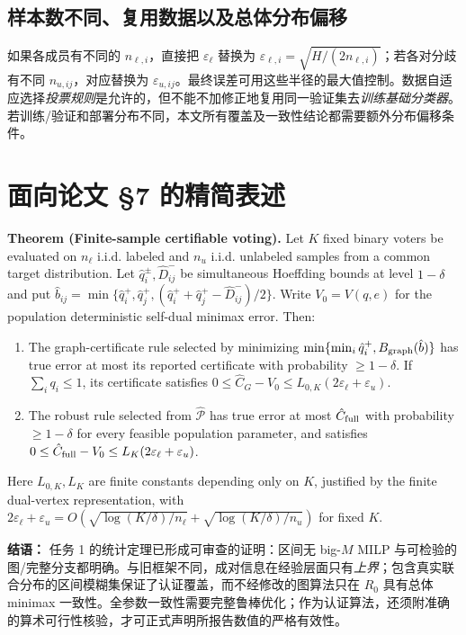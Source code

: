 \documentclass[11pt,a4paper]{ctexart}
\theoremstyle{definition}
\newcommand{\calP}{\mathcal P}
\newcommand{\epsl}{\varepsilon_{\ell}}
\newcommand{\epsu}{\varepsilon_u}
\begin{document}
\subsection{样本数不同、复用数据以及总体分布偏移}
如果各成员有不同的 $n_{\ell,i}$，直接把 $\epsl$ 替换为 $\varepsilon_{\ell,i}=\sqrt{H/(2n_{\ell,i})}$；若各对分歧有不同 $n_{u,ij}$，对应替换为 $\varepsilon_{u,ij}$。最终误差可用这些半径的最大值控制。数据自适应选择\emph{投票规则}是允许的，但不能不加修正地复用同一验证集去\emph{训练基础分类器}。若训练/验证和部署分布不同，本文所有覆盖及一致性结论都需要额外分布偏移条件。

\section{面向论文 \S7 的精简表述}
\begin{keybox}
\textbf{Theorem (Finite-sample certifiable voting).}
Let $K$ fixed binary voters be evaluated on $n_\ell$ i.i.d. labeled and $n_u$ i.i.d. unlabeled samples from a common target distribution. Let $\hat q_i^\pm,\hat D_{ij}^-$ be simultaneous Hoeffding bounds at level $1-\delta$ and put $\hat b_{ij}=\min\{\hat q_i^+,\hat q_j^+,(\hat q_i^++\hat q_j^+-\hat D_{ij}^-)/2\}$. Write $V_0=V(q,e)$ for the population deterministic self-dual minimax error. Then: 
\begin{enumerate}[leftmargin=1.5em]
\item The graph-certificate rule selected by minimizing $\min\{\min_i\hat q_i^+,B_{\rm graph}(\hat b)\}$ has true error at most its reported certificate with probability $\ge1-\delta$. If $\sum_iq_i\le1$, its certificate satisfies $0\le\hat C_G-V_0\le L_{0,K}(2\epsl+\epsu)$.
\item The robust rule selected from $\widehat{\calP}$ has true error at most $\hat C_{\rm full}$ with probability $\ge1-\delta$ for every feasible population parameter, and satisfies $0\le\hat C_{\rm full}-V_0\le L_K(2\epsl+\epsu)$.
\end{enumerate}
Here $L_{0,K},L_K$ are finite constants depending only on $K$, justified by the finite dual-vertex representation, with $2\epsl+\epsu=O(\sqrt{\log(K/\delta)/n_\ell}+\sqrt{\log(K/\delta)/n_u})$ for fixed $K$.
\end{keybox}
\vspace{.4em}
\noindent\textbf{结语：} 任务 1 的统计定理已形成可审查的证明：区间无 big-$M$ MILP 与可检验的图/完整分支都明确。与旧框架不同，成对信息在经验层面只有\emph{上界}；包含真实联合分布的区间模糊集保证了认证覆盖，而不经修改的图算法只在 $R_0$ 具有总体 minimax 一致性。全参数一致性需要完整鲁棒优化；作为认证算法，还须附准确的算术可行性核验，才可正式声明所报告数值的严格有效性。
\end{document}
